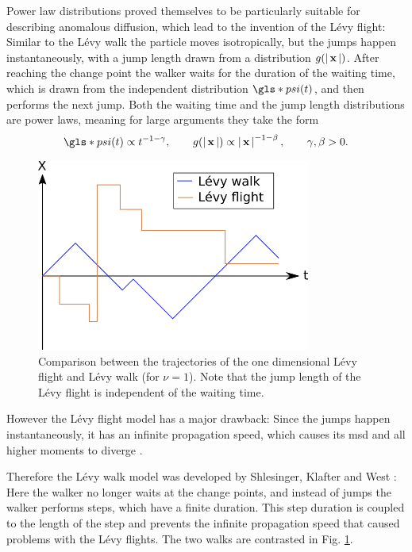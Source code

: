 Power law distributions proved themselves to be particularly suitable for describing anomalous diffusion, which lead to the invention of the L\'evy flight: Similar to the L\'evy walk the particle moves isotropically, but the jumps happen instantaneously, with a jump length drawn from a distribution $g(\left|\,\mathbf{ x }\,\right|)$. After reaching the change point the walker waits for the duration of the waiting time, which is drawn from the independent distribution $\gls*{psi}(t)$, and then performs the next jump. Both the waiting time and the jump length distributions are power laws, meaning for large arguments they take the form 
%
\begin{align}
\gls*{psi}(t) \propto t^{-1-\gamma}, \qquad g(\abs{\ve{x}}) \propto \abs{\ve{x}}^{-1-\beta}, \qquad \gamma, \beta > 0.
\end{align} 
%
\begin{figure}
\begin{center}
\includegraphics[width=90mm]{pics/levyFlight.png}
\caption{Comparison between the trajectories of the one dimensional L\'evy flight and L\'evy walk (for $\nu=1$). Note that the jump length of the L\'evy flight is independent of the waiting time.
\label{fig:levyFlight}}
\end{center}
\end{figure}
%
However the L\'evy flight model has a major drawback: Since the jumps happen instantaneously, it has an infinite propagation speed, which causes its \gls*{msd} and all higher moments to diverge 
\cite{lwreview}. 

Therefore the L\'evy walk model was developed by Shlesinger, Klafter and West
\cite{shlesinger1987}:
Here the walker no longer waits at the change points, and instead of jumps the walker performs steps, which have a finite duration. This step duration is coupled to the length of the step and prevents the infinite propagation speed that caused problems with the L\'evy flights. The two walks are contrasted in Fig. \ref{fig:levyFlight}. 

